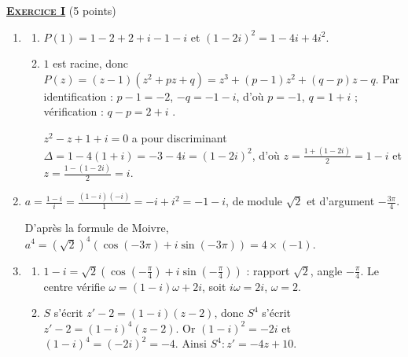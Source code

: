 \providecommand{\Courbe}{(\mathscr{C})}
\providecommand{\CourbeP}{(\mathscr{C}')}
\providecommand{\D}{(\mathscr{D})}
\providecommand{\cm}{~\mathrm{cm}}
\providecommand{\dx}{~\mathrm{d}x}
%
\noindent \underline{\textsc{\textbf{Exercice I}}} (5 points)
	\begin{enumerate}
		\item \begin{enumerate}
			\item {}
				$P(1) = 1 - 2 + 2 + i - 1 - i$ et $(1-2i)^2 = 1 - 4i + 4i^2$.

			\item {}
				$1$ est racine, donc $P(z) = (z-1)(z^2 + pz + q) = z^3 + (p-1)z^2 + (q-p)z - q$.
				Par identification : $p - 1 = -2$, $-q = -1 - i$, d'où $p = -1$, $q = 1 + i$ ; vérification : $q - p = 2 + i$ \checkmark.

				$z^2 - z + 1 + i = 0$ a pour discriminant $\Delta = 1 - 4(1+i) = -3 - 4i = (1-2i)^2$, d'où
				$z = \frac{1 + (1-2i)}{2} = 1 - i$ et $z = \frac{1 - (1-2i)}{2} = i$.

		\end{enumerate}
		\item {}
			$a = \frac{1-i}{i} = \frac{(1-i)(-i)}{1} = -i + i^2 = -1 - i$, de module $\sqrt{2}$ et d'argument $-\frac{3\pi}{4}$.


			D'après la formule de Moivre, $a^4 = \left(\sqrt{2}\right)^4\left(\cos(-3\pi) + i\sin(-3\pi)\right) = 4\times(-1)$.

		\item \begin{enumerate}
			\item {}
				$1 - i = \sqrt{2}\left(\cos\left(-\frac{\pi}{4}\right) + i\sin\left(-\frac{\pi}{4}\right)\right)$ : rapport $\sqrt{2}$, angle $-\frac{\pi}{4}$.
				Le centre vérifie $\omega = (1-i)\omega + 2i$, soit $i\omega = 2i$, $\omega = 2$.

			\item {}
				$S$ s'écrit $z' - 2 = (1-i)(z-2)$, donc $S^4$ s'écrit $z' - 2 = (1-i)^4(z-2)$.
				Or $(1-i)^2 = -2i$ et $(1-i)^4 = (-2i)^2 = -4$. Ainsi $S^4 : z' = -4z + 10$.


\end{enumerate}
\end{enumerate}
